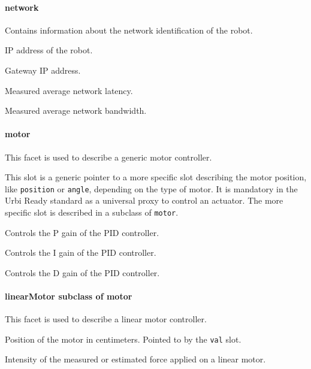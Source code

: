 \paragraph{network}

Contains information about the network identification of the robot.

\begin{slots}
  {%
    IP address of the robot.%
  }

  {%
    Gateway IP address.%
  }

  {%
    Measured average network latency.%
  }

  {%
    Measured average network bandwidth.%
  }

\end{slots}

\paragraph{motor}

This facet is used to describe a generic motor controller.

\begin{slots}
  {%
    This slot is a generic pointer to a more specific slot describing
    the motor position, like \texttt{position} or \texttt{angle},
    depending on the type of motor. It is mandatory in the Urbi Ready
    standard as a universal proxy to control an actuator. The more
    specific slot is described in a subclass of \texttt{motor}.%
  }

  {%
    Controls the P gain of the PID controller.%
  }

  {%
    Controls the I gain of the PID controller.%
  }

  {%
    Controls the D gain of the PID controller.%
  }

\end{slots}

\paragraph{ linearMotor  \textmd{subclass of motor}}


This facet is used to describe a linear motor controller.

\begin{slots}
  {%
    Position of the motor in centimeters.  Pointed to by the
    \texttt{val} slot.%
  }

  {%
    Intensity of the measured or estimated force applied on a linear
    motor.%
  }

\end{slots}

